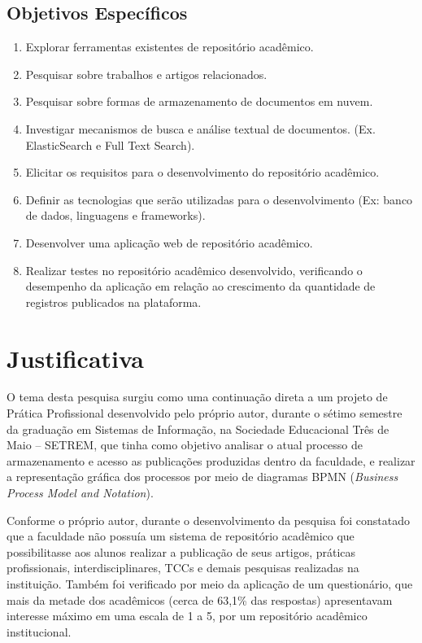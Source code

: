 \subsection{Objetivos Específicos}
\begin{enumerate}
      \item Explorar ferramentas existentes de repositório acadêmico.
      \item Pesquisar sobre trabalhos e artigos relacionados.
      \item Pesquisar sobre formas de armazenamento de documentos em nuvem.
      \item Investigar mecanismos de busca e análise textual de documentos. (Ex. ElasticSearch e Full Text Search).
      \item Elicitar os requisitos para o desenvolvimento do repositório acadêmico.
      \item Definir as tecnologias que serão utilizadas para o desenvolvimento (Ex: banco de dados, linguagens e frameworks).
      \item Desenvolver uma aplicação web de repositório acadêmico.
      \item Realizar testes no repositório acadêmico desenvolvido, verificando o desempenho da aplicação em relação ao crescimento da quantidade de registros publicados na plataforma.

\end{enumerate}


\section{Justificativa}\label{sec:justification}

O tema desta pesquisa surgiu como uma continuação direta a um projeto
de Prática Profissional desenvolvido pelo próprio autor, durante o sétimo
semestre da graduação em Sistemas de Informação, na Sociedade Educacional
Três de Maio – SETREM, que tinha como objetivo analisar o atual processo
de armazenamento e acesso as publicações produzidas dentro da faculdade,
e realizar a representação gráfica dos processos por meio de diagramas BPMN
(\emph{Business Process Model and Notation}).

Conforme o próprio autor, durante o desenvolvimento da pesquisa foi constatado que a faculdade
não possuía um sistema de repositório acadêmico que possibilitasse aos
alunos realizar a publicação de seus artigos, práticas profissionais,
interdisciplinares, TCCs e demais pesquisas realizadas na instituição.
Também foi verificado por meio da aplicação de um questionário, que
mais da metade dos acadêmicos (cerca de 63,1\% das respostas) apresentavam
interesse máximo em uma escala de 1 a 5, por um repositório acadêmico
institucional.

